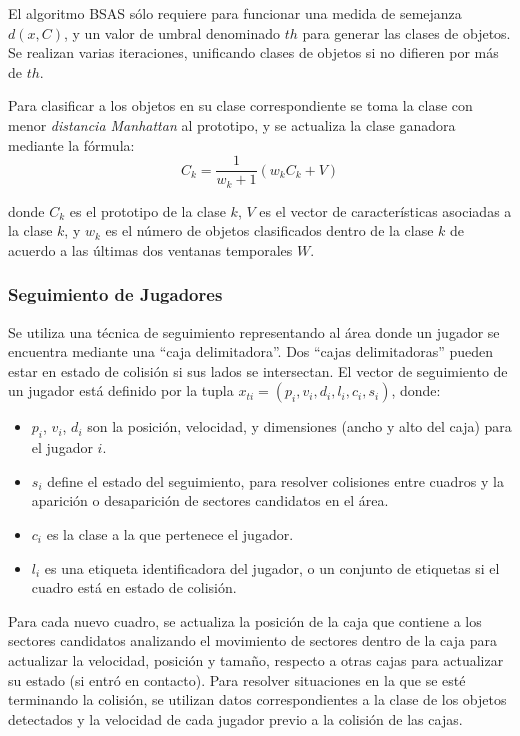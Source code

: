 El algoritmo BSAS sólo requiere para funcionar una medida de semejanza $d(x, C)$,
y un valor de umbral denominado $th$ para generar las clases de objetos.
Se realizan varias iteraciones, unificando clases de objetos si no difieren
por más de $th$.

Para clasificar a los objetos en su clase correspondiente se toma la clase con
menor \textit{distancia Manhattan} al prototipo, y se actualiza la clase
ganadora mediante la fórmula:
\[
  C_k = \frac{1}{w_k+1}(w_k C_k + V)
\]

donde $C_k$ es el prototipo de la clase $k$, $V$ es el vector de
características asociadas a la clase $k$, y $w_k$ es el número de
objetos clasificados dentro de la clase $k$ de acuerdo a las últimas dos
ventanas temporales $W$.

\subsubsection{Seguimiento de Jugadores}

Se utiliza una técnica de seguimiento representando al área donde un jugador se
encuentra mediante una ``caja delimitadora''.
Dos ``cajas delimitadoras'' pueden estar en estado de colisión si sus lados se
intersectan. El vector de seguimiento de un jugador está definido por la tupla
$x_{ti} = (p_i, v_i, d_i, l_i, c_i, s_i)$, donde:

\begin{itemize}
  \item $p_i$, $v_i$, $d_i$ son la posición, velocidad, y dimensiones
    (ancho y alto del caja) para el jugador $i$.
  \item $s_i$ define el estado del seguimiento, para resolver
    colisiones entre cuadros y la aparición o desaparición de
    sectores candidatos en el área.
  \item $c_i$ es la clase a la que pertenece el jugador.
  \item $l_i$ es una etiqueta identificadora del jugador, o un conjunto de
etiquetas si el cuadro está en estado de colisión.
\end{itemize}

Para cada nuevo cuadro, se actualiza la posición de la caja que contiene a
los sectores candidatos analizando el movimiento de sectores dentro de la
caja para actualizar la velocidad, posición y tamaño,
respecto a otras cajas para actualizar su estado (si entró en contacto).
Para resolver situaciones en la que se esté terminando la colisión, se utilizan
datos correspondientes a la clase de los objetos detectados y la velocidad de
cada jugador previo a la colisión de las cajas.

